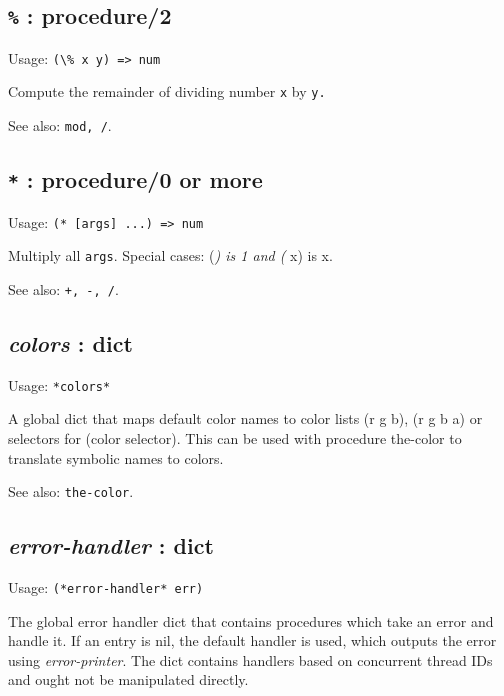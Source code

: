 \documentclass[
]{article}
\newcommand{\passthrough}[1]{#1}
\begin{document}
\hypertarget{procedure2-7}{%
\subsection{\texorpdfstring{\texttt{\%} :
procedure/2}{\% : procedure/2}}\label{procedure2-7}}

Usage: \passthrough{\lstinline!(\% x y) => num!}

Compute the remainder of dividing number \passthrough{\lstinline!x!} by
\passthrough{\lstinline!y.!}

See also: \passthrough{\lstinline!mod, /!}.

\hypertarget{procedure0-or-more-2}{%
\subsection{\texorpdfstring{\texttt{*} : procedure/0 or
more}{* : procedure/0 or more}}\label{procedure0-or-more-2}}

Usage: \passthrough{\lstinline!(* [args] ...) => num!}

Multiply all \passthrough{\lstinline!args!}. Special cases: (\emph{) is
1 and (} x) is x.

See also: \passthrough{\lstinline!+, -, /!}.

\hypertarget{colors-dict-1}{%
\subsection{\texorpdfstring{\emph{colors} :
dict}{colors : dict}}\label{colors-dict-1}}

Usage: \passthrough{\lstinline!*colors*!}

A global dict that maps default color names to color lists (r g b), (r g
b a) or selectors for (color selector). This can be used with procedure
the-color to translate symbolic names to colors.

See also: \passthrough{\lstinline!the-color!}.

\hypertarget{error-handler-dict-1}{%
\subsection{\texorpdfstring{\emph{error-handler} :
dict}{error-handler : dict}}\label{error-handler-dict-1}}

Usage: \passthrough{\lstinline!(*error-handler* err)!}

The global error handler dict that contains procedures which take an
error and handle it. If an entry is nil, the default handler is used,
which outputs the error using \emph{error-printer}. The dict contains
handlers based on concurrent thread IDs and ought not be manipulated
directly.
\end{document}

